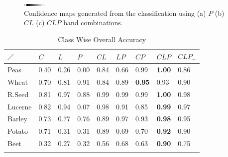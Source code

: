\begin{figure}[tbp]
            \includegraphics[width=0.1\textwidth]{Figures/Kron/Conf/grad}
    \caption{Confidence maps generated from the classification using (a) $P$ (b) $CL$ (c) $CLP$ band combinations.}\label{fig:Conf}
\end{figure}


\begin{table}[tbp]
	\centering
	\caption{Class Wise Overall Accuracy}
	\label{tab:class}
	\begin{tabularx}{\columnwidth}{XXXXXXXXX}
		\hline \noalign{\vskip 0.5mm} 
		$\diagup$ & $C$    & $L$    & $P$    & $CL$   & $LP$   & $CP$   & $CLP$ & $CLP_+$  \\ \hline \noalign{\vskip 0.3mm}
		Peas     & 0.40 & 0.26 & 0.00 & 0.84 & 0.66 & 0.99 & \textbf{1.00} & 0.86\\
		Wheat    & 0.70 & 0.81 & 0.91 & 0.84 & 0.89 & \textbf{0.95} & 0.93 & 0.90\\
		R.Seed & 0.81 & 0.97 & 0.88 & 0.99 & 0.99 & 0.99 & \textbf{1.00} & 0.98\\
		Lucerne  & 0.82 & 0.94 & 0.07 & 0.98 & 0.91 & 0.85 & \textbf{0.99} & 0.97\\
		Barley   & 0.73 & 0.77 & 0.76 & 0.89 & 0.97 & 0.93 & \textbf{0.98} & 0.95\\
		Potato   & 0.71 & 0.31 & 0.31 & 0.89 & 0.69 & 0.70 & \textbf{0.92} & 0.90\\
		Beet     & 0.32 & 0.27 & 0.32 & 0.56 & 0.68 & 0.63 & \textbf{0.90} & 0.75\\ \hline  \noalign{\vskip 1mm} 
	\end{tabularx}
\end{table}

